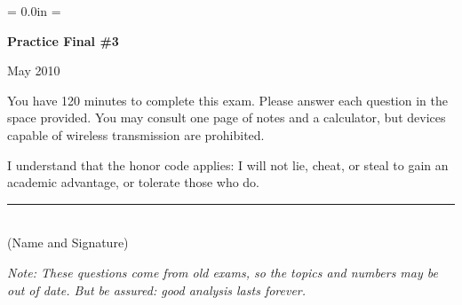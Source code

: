 \documentclass[letterpaper,12pt]{exam}
\def\HeadName{Practice Final \#1}
\begin{document}




\newpage
\def\HeadName{Practice Final \#3}
\parindent = 0.0in
\parskip = \bigskipamount
\setcounter{page}{1} \thispagestyle{empty}
\Head

\centerline{\large \bf \HeadName}%
\centerline{May 2010}

\bigskip
You have 120 minutes to complete this exam.  Please answer each
question in the space provided. You may consult one page of notes
and a calculator, but devices capable of wireless transmission are
prohibited.

I understand that the honor code applies: I will not lie, cheat,
or steal to gain an academic advantage, or tolerate those who do.

\begin{flushright}
\rule{4in}{0.5pt} \\ (Name and Signature)
\end{flushright}

{\it Note:  These questions come from old exams,
so the topics and numbers may be out of date.
But be assured:  good analysis lasts forever.}
\end{document}
